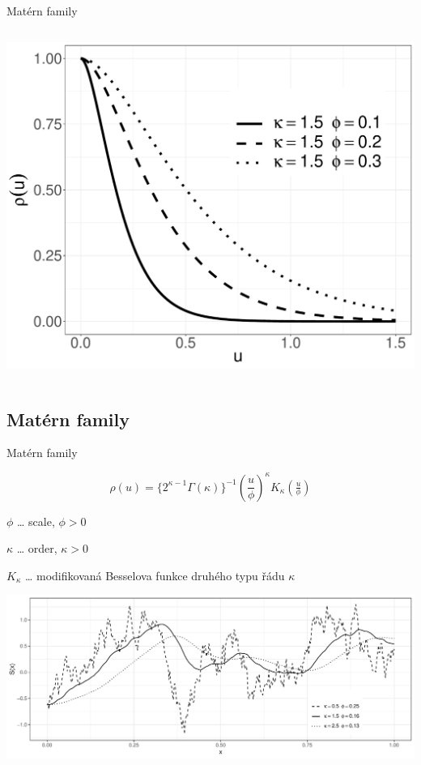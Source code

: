 \documentclass[
  ignorenonframetext,
]{beamer}
\begin{document}
\begin{frame}{Matérn family}
\begin{columns}[T]
\begin{column}{0.5\textwidth}
\includegraphics{Lecture_1_files/figure-beamer/unnamed-chunk-25-1.pdf}
\end{column}
\end{columns}
\end{frame}

\hypertarget{matuxe9rn-family-1}{%
\subsection{Matérn family}\label{matuxe9rn-family-1}}

\begin{frame}{Matérn family}
\large

\[\rho(u)=\{2^{\kappa-1}\Gamma(\kappa)\}^{-1}\left(\frac{u}{\phi}\right)^\kappa K_\kappa\left(\tfrac{u}{\phi}\right)\]

\small

\(\phi\) \ldots{} scale, \(\phi>0\)

\(\kappa\) \ldots{} order, \(\kappa>0\)

\(K_\kappa\) \ldots{} modifikovaná Besselova funkce druhého typu řádu
\(\kappa\)

\includegraphics{Lecture_1_files/figure-beamer/unnamed-chunk-26-1.pdf}
\end{frame}
\end{document}
